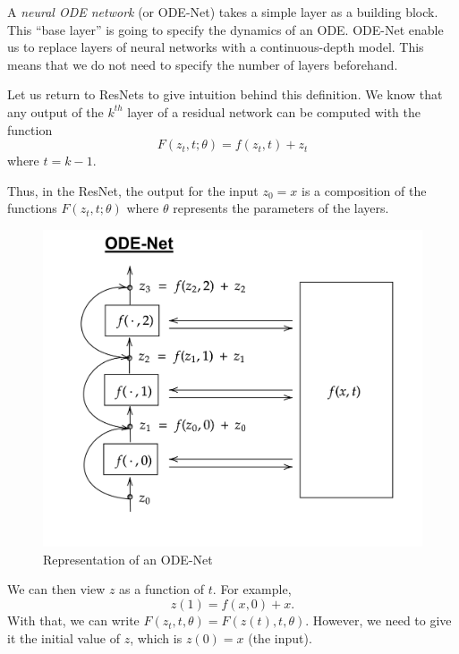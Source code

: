 \documentclass[10pt,a4paper]{article}
\theoremstyle{definition}
\theoremstyle{definition}
\theoremstyle{definition}
\begin{document}
A \textit{neural ODE network} (or ODE-Net) takes a simple layer as a building block. This “base layer” is going to specify the dynamics of an ODE.
ODE-Net enable us to replace layers of neural networks with a continuous-depth model. This means that we do not need to specify the number of layers beforehand.

Let us return to ResNets to give intuition behind this definition. We know that any output of the $k^{th}$ layer of a residual network can be computed with the function
\begin{equation*}
F(z_t, t; \theta) = f(z_t, t) + z_t
\end{equation*}
where $t = k - 1$.

Thus, in the ResNet, the output for the input $z_0 = x$ is a composition of the functions $F(z_t, t; \theta)$ where $\theta$ represents the parameters of the layers.


\begin{figure}
\center
\includegraphics[scale=0.18]{ODENet.png}
\caption{Representation of an ODE-Net}
\end{figure}

We can then view $z$ as a function of $t$. For example,
\begin{equation*}
z(1) = f(x, 0) + x.
\end{equation*}
With that, we can write $F(z_t, t, \theta) = F(z(t), t, \theta)$. However, we need to give it the initial value of $z$, which is $z(0) = x$ (the input).

~
\end{document}

